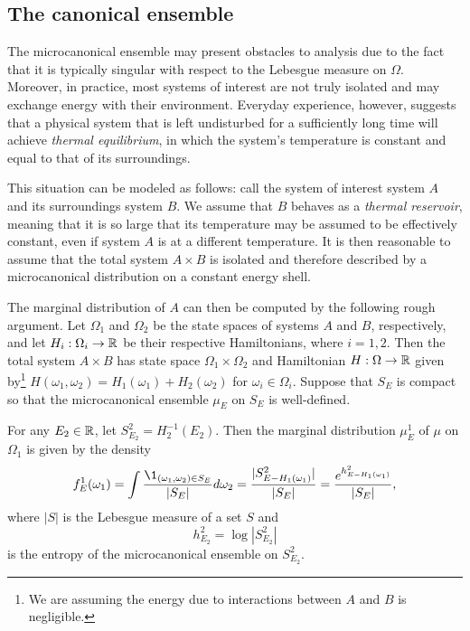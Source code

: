 \subsection{The canonical ensemble}

The microcanonical ensemble may present obstacles to analysis due to the fact that
it is typically singular with respect to the Lebesgue measure on $\Omega$.
Moreover, in practice, most systems of interest are not truly isolated and may exchange
energy with
their environment. Everyday experience, however, suggests that
a physical system that is left undisturbed for a sufficiently long time will achieve
\emph{thermal equilibrium}, in which the system's
temperature is constant and equal to that of its surroundings.

This situation can be modeled as follows: call the system of interest system $A$ and
its surroundings system $B$. We assume that $B$ behaves as a \emph{thermal reservoir},
meaning that it is so large that its temperature may be assumed to be effectively
constant, even if system $A$ is at a different temperature.
It is then reasonable to assume that the total system $A \times B$
is isolated and therefore described by a microcanonical distribution on a constant energy shell.

The marginal distribution of $A$ can then be computed by the following rough argument.
Let $\Omega_1$ and $\Omega_2$ be the state spaces of systems $A$ and
$B$, respectively, and let $H_i : \Omega_i \rightarrow {\mathbb R}$ be their respective Hamiltonians,
where $i = 1, 2$. Then the total system $A \times B$ has state space $\Omega_1 \times \Omega_2$
and Hamiltonian $H : \Omega \rightarrow {\mathbb R}$ given by\footnote{We are assuming the energy due to interactions
between $A$ and $B$ is negligible.}
$H(\omega_1, \omega_2) = H_1(\omega_1) + H_2(\omega_2)$
for $\omega_i \in \Omega_i$. Suppose that $S_E$ is compact so that the microcanonical ensemble $\mu_E$
on $S_E$ is well-defined.

For any $E_2 \in {\mathbb R}$, let $S^2_{E_2} = H_2^{-1}(E_2)$. Then the marginal distribution $\mu^1_E$
of $\mu$ on $\Omega_1$ is given by the density
\begin{equation}
f^1_E(\omega_1)
  =
\int \frac{\1_{(\omega_1, \omega_2) \in S_E}}{|S_E|} d\omega_2
  =
\frac{|S^2_{E-H_1(\omega_1)}|}{|S_E|}
  =
\frac{e^{h^2_{E-H_1(\omega_1)}}}{|S_E|},
\end{equation}
where $|S|$ is the Lebesgue measure of a set $S$ and
\begin{equation}
h^2_{E_2} = \log |S^2_{E_2}|
\end{equation}
is the entropy of the microcanonical ensemble on $S^2_{E_2}$.

